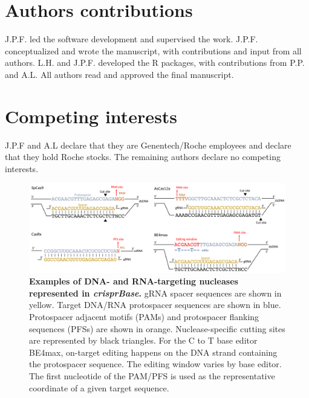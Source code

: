 \documentclass[pdftex,english,10pt]{article}
\begin{document}
{%
\section*{Authors contributions}

J.P.F. led the software development and supervised the work.
J.P.F. conceptualized and wrote the manuscript, with contributions and input from all authors. 
L.H. and J.P.F. developed the R packages, with contributions from P.P. and A.L. 
All authors read and approved the final manuscript.

\section*{Competing interests}

J.P.F and A.L declare that they are Genentech/Roche employees and declare that they hold Roche stocks. 
The remaining authors declare no competing interests.


\clearpage

\begin{figure}[!h]
\centering
\includegraphics[width=1\textwidth]{Figure1.pdf}
  \caption{\textbf{Examples of DNA- and RNA-targeting nucleases represented in \textit{crisprBase}.} gRNA spacer sequences are shown in yellow. Target DNA/RNA protospacer sequences are shown in blue. Protospacer adjacent motifs (PAMs) and protospacer flanking sequences (PFSs) are shown in orange. Nuclease-specific cutting sites are represented by black triangles. For the C to T base editor BE4max, on-target editing happens on the DNA strand containing the protospacer sequence. The editing window varies by base editor. The first nucleotide of the PAM/PFS is used as the representative coordinate of a given target sequence. 
  }
  \label{fig:nucleases}
\end{figure}



}
\end{document}
